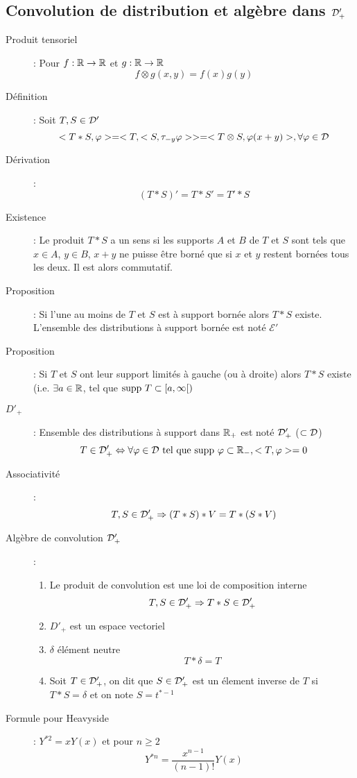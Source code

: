 \subsection{Convolution de distribution et algèbre dans $\mathcal{D}'_+$}
\begin{description}
\item[Produit tensoriel] : Pour $f:\mathbb{R}\rightarrow\mathbb{R}$ et $g:\mathbb{R}\rightarrow\mathbb{R}$
    \[
        f \otimes g(x,y)=f(x)g(y)
    \]
\item[Définition] : Soit $T,S\in\mathcal{D}'$
    \[
        <T*S,\varphi>
        =<T,<S,\tau_{-y}\varphi>>
        =<T\otimes S, \varphi(x+y)>,\forall\varphi\in\mathcal{D}
    \]
\item[Dérivation] :
    \[ (T*S)'=T*S'=T'*S \]
\item[Existence] : Le produit $T * S$ a un sens si les supports $A$ et $B$ de $T$ et $S$ sont tels que $x \in A$, $y \in B$, $x + y$ ne
puisse être borné que si $x$ et $y$ restent bornées tous les deux. Il est alors commutatif.
\item[Proposition] : Si l'une au moins de $T$ et $S$ est à support bornée alors $T * S$ existe. L'ensemble des distributions
à support bornée est noté $\mathcal E'$
\item[Proposition] : Si $T$ et $S$ ont leur support limités à gauche (ou à droite) alors $T * S$ existe (i.e. $\exists a \in\mathbb{R}$, tel que
$\textrm{supp } T \subset [a, \infty[)$
\item[$D'_+$] : Ensemble des distributions à support dans $\mathbb{R}_+$ est noté $\mathcal{D}'_+$ ($\subset\mathcal{D}$)
    \[ T\in\mathcal{D}'_+\Leftrightarrow\forall\varphi\in\mathcal{D}\textrm{ tel que }\textrm{supp }\varphi\subset\mathbb{R}_-,<T,\varphi>=0 \]
\item[Associativité] :
    \[
        T,S\in\mathcal{D}'_+\Rightarrow(T*S)*V=T*(S*V)
    \]
\item[Algèbre de convolution $\mathcal{D}'_+$] :
\begin{enumerate}
    \item Le produit de convolution est une loi de composition interne
        \[ T,S\in\mathcal{D}'_+\Rightarrow T*S\in\mathcal{D}'_+ \]
    \item $D'_+$ est un espace vectoriel
    \item $\delta$ élément neutre
        \[ T*\delta=T \]
    \item Soit $T\in\mathcal{D}'_+$, on dit que $S\in\mathcal{D}'_+$ est un élement inverse de $T$ si
    $T*S=\delta$ et on note $S=t^{*-1}$
\end{enumerate}
\item[Formule pour Heavyside] : $Y^{*2}=xY(x)$ et pour $n\ge 2$
    \[
        Y^{*n}=\frac{x^{n-1}}{(n-1)!}Y(x)
\]
\end{description}
